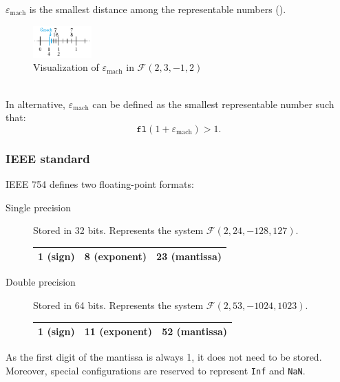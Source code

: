 $\varepsilon_{\text{mach}}$ is the smallest distance among the representable numbers ().
\begin{figure}[h]
    \centering
    \includegraphics[width=0.2\textwidth]{img/machine_eps.png}
    \caption{Visualization of $\varepsilon_{\text{mach}}$ in $\mathcal{F}(2, 3, -1, 2)$}
    \label{fig:finnum_eps}
\end{figure}\\
%
In alternative, $\varepsilon_{\text{mach}}$ can be defined as the smallest representable number such that:
\begin{equation*}
    \texttt{fl}(1 + \varepsilon_{\text{mach}}) > 1.
\end{equation*}


\subsubsection{IEEE standard}
IEEE 754 defines two floating-point formats:
\begin{description}
    \item[Single precision] Stored in 32 bits. Represents the system $\mathcal{F}(2, 24, -128, 127)$.
        \begin{center}
            \small
            \begin{tabular}{|c|c|c|}
                \hline
                1 (sign) & 8 (exponent) & 23 (mantissa) \\
                \hline
            \end{tabular}
        \end{center}

    \item[Double precision] Stored in 64 bits. Represents the system $\mathcal{F}(2, 53, -1024, 1023)$.
        \begin{center}
            \small
            \begin{tabular}{|c|c|c|}
                \hline
                1 (sign) & 11 (exponent) & 52 (mantissa) \\
                \hline
            \end{tabular}
        \end{center}
\end{description}
As the first digit of the mantissa is always 1, it does not need to be stored.
Moreover, special configurations are reserved to represent \texttt{Inf} and \texttt{NaN}.


